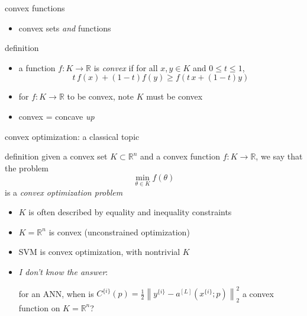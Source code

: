 \documentclass[xcolor={svgnames},
               hyperref={colorlinks,citecolor=DeepPink4,linkcolor=FireBrick,urlcolor=Maroon}]
               {beamer}
\newcommand{\RR}{\mathbb{R}}
\begin{document}
\begin{frame}{convex functions}

\begin{itemize}
\item convex sets \emph{and} functions
\end{itemize}

\begin{block}{definition}
\begin{itemize}
\item a function $f:K \to \RR$ is \emph{convex} if for all $x,y \in K$ and $0 \le t \le 1$,
  $$t\, f(x) + (1-t) f(y) \ge f(t\, x + (1-t) y)$$
\end{itemize}
\end{block}

\begin{itemize}
\item for $f:K\to \RR$ to be convex, note $K$ must be convex
\item convex = concave \emph{up}
\end{itemize}
\end{frame}


\begin{frame}{convex optimization: a classical topic}

\begin{block}{definition}
given a convex set $K \subset \RR^n$ and a convex function $f:K\to \RR$, we say that the problem
    $$\min_{\theta \in K} f(\theta)$$
is a \emph{convex optimization problem}
\end{block}

\begin{itemize}
\item $K$ is often described by equality and inequality constraints
\item $K=\RR^n$ is convex (unconstrained optimization)
\item SVM is convex optimization, with nontrivial $K$
\item \emph{I don't know the answer}:

for an ANN, when is $C^{\{i\}}(p) = \frac{1}{2} \left\|y^{\{i\}} - a^{[L]}(x^{\{i\}}; p)\right\|_2^2$ a convex function on $K = \RR^n$?
\end{itemize}
\end{frame}
\end{document}
